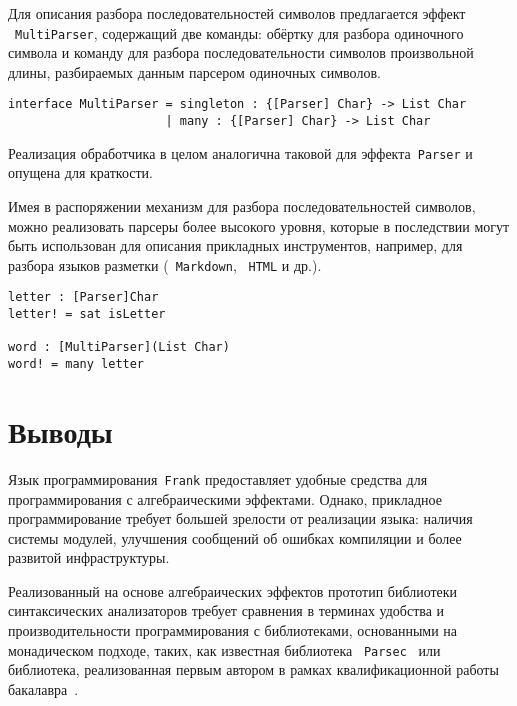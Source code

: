 \documentclass [a4paper] {article}
\begin{document}
Для описания разбора последовательностей символов предлагается эффект
~\texttt{MultiParser}, содержащий две команды: обёртку для разбора одиночного
символа и команду для разбора последовательности символов произвольной длины,
разбираемых данным парсером одиночных символов.

\begin{verbatim}
interface MultiParser = singleton : {[Parser] Char} -> List Char
                      | many : {[Parser] Char} -> List Char
\end{verbatim}

Реализация обработчика в целом аналогична таковой для эффекта~\texttt{Parser}
и опущена для краткости.

Имея в распоряжении механизм для разбора последовательностей символов, можно
реализовать парсеры более высокого уровня, которые в последствии могут быть
использован для описания прикладных инструментов, например, для разбора
языков разметки (~\texttt{Markdown}, ~\texttt{HTML} и др.).

\begin{verbatim}
letter : [Parser]Char
letter! = sat isLetter

word : [MultiParser](List Char)
word! = many letter
\end{verbatim}

\section{Выводы}

Язык программирования~\texttt{Frank} предоставляет удобные средства для программирования
с алгебраическими эффектами. Однако, прикладное программирование требует большей
зрелости от реализации языка: наличия системы модулей, улучшения сообщений об
ошибках компиляции и более развитой инфраструктуры.

Реализованный на основе алгебраических эффектов прототип библиотеки
~\cite{frankoparsec} синтаксических анализаторов требует сравнения в терминах
удобства и производительности программирования с библиотеками,
основанными на монадическом подходе, таких, как известная библиотека
~\texttt{Parsec}~\cite{parsec} или библиотека, реализованная первым автором в
рамках квалификационной работы бакалавра~\cite{mdParse}.

\printbibliography

\end{document}

